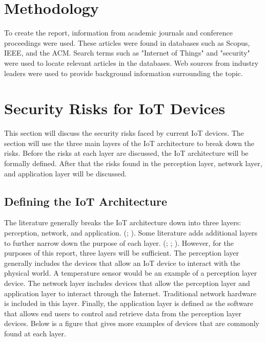\documentclass[letterpaper, 12pt]{article}
\begin{document}
\begin{flushleft}
\section*{Methodology}

To create the report, information from academic journals and conference proceedings were used. These articles were found in 
databases such as Scopus, IEEE, and the ACM. Search terms such as "Internet of Things" and "security" were used to locate
relevant articles in the databases. Web sources from industry leaders were used to provide background information surrounding
the topic.\\ 


\section*{Security Risks for IoT Devices}

This section will discuss the security risks faced by current IoT devices. The section will use the three main layers of the IoT architecture to break down the risks. Before the risks at each layer are discussed,
the IoT architecture will be formally defined. After that the risks found in the perception layer, network layer, and application layer will be discussed.

\subsection*{Defining the IoT Architecture}
The literature generally breaks the IoT architecture down into three layers: perception, network, and application. (\cite{Zhao6746513}; \cite{Xiaohui6643029}). Some literature adds additional layers to further narrow down the purpose of each
layer. (\cite{Granjal7005393}; \cite{Kozlov}; \cite{Suo6188257}). However, for the purposes of this report, three layers will be sufficient. The perception layer 
generally includes the devices that allow an IoT device to interact with the physical world. A temperature sensor would be an example of a
perception layer device. The network layer includes devices that allow the perception layer and application layer to interact through the Internet.
Traditional network hardware is included in this layer. Finally, the application layer is defined as the software that allows end users to control
and retrieve data from the perception layer devices. Below is a figure that gives more examples of devices that are commonly found at each layer.


\end{flushleft}
\end{document}
